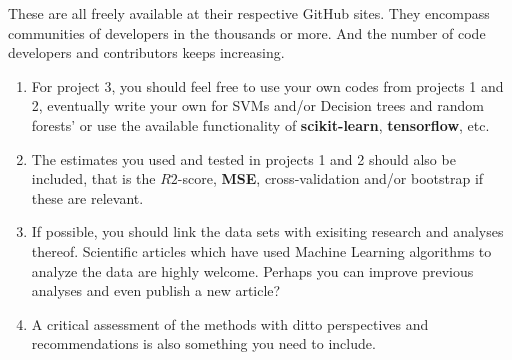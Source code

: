 \documentclass[%
oneside,                 %
final,                   %
10pt]{article}
\begin{document}
\noindent
These are all freely available at their respective GitHub sites. They 
encompass communities of developers in the thousands or more. And the number
of code developers and contributors keeps increasing.
















\begin{enumerate}
\item For project 3, you should feel free to use your own codes from projects 1 and 2, eventually write your own for SVMs and/or Decision trees and random forests' or use the available functionality of \textbf{scikit-learn}, \textbf{tensorflow}, etc. 

\item The estimates you used and tested in projects 1 and 2 should also be included, that is the $R2$-score, \textbf{MSE}, cross-validation and/or bootstrap if these are relevant. 

\item If possible, you should link the data sets with exisiting research and analyses thereof. Scientific articles which have used Machine Learning algorithms to analyze the data are highly welcome. Perhaps you can improve previous analyses and even publish a new article? 

\item A critical assessment of the methods with ditto perspectives and recommendations is also something you need to include.
\end{enumerate}

\noindent


\end{document}
